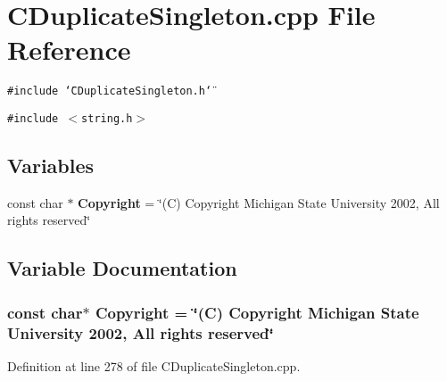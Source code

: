 \section{CDuplicate\-Singleton.cpp File Reference}
\label{CDuplicateSingleton_8cpp}
{\tt \#include \char`\"{}CDuplicate\-Singleton.h\char`\"{}}\par
{\tt \#include $<$string.h$>$}\par
\subsection*{Variables}
\begin{CompactItemize}
\item 
const char $\ast$ {\bf Copyright} = \char`\"{}(C) Copyright Michigan State University 2002, All rights reserved\char`\"{}
\end{CompactItemize}


\subsection{Variable Documentation}
\subsubsection{\setlength{\rightskip}{0pt plus 5cm}const char$\ast$ Copyright = \char`\"{}(C) Copyright Michigan State University 2002, All rights reserved\char`\"{}\hspace{0.3cm}{\tt  [static]}}\label{CDuplicateSingleton_8cpp_a0}




Definition at line 278 of file CDuplicate\-Singleton.cpp.